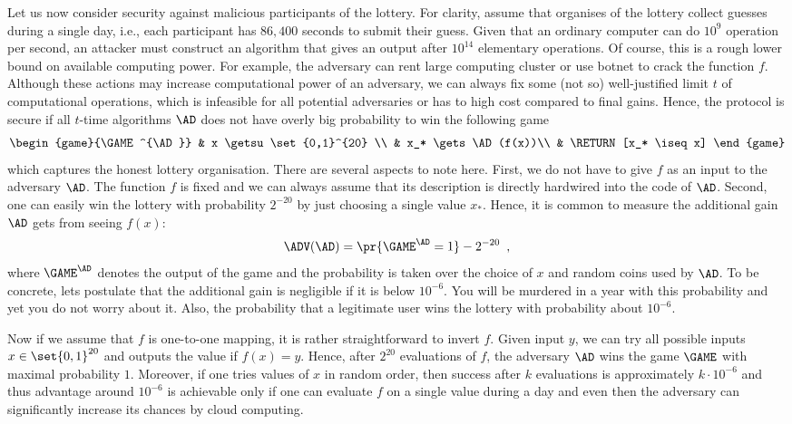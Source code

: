 \documentclass{crypto-exercise}
\begin{document}
\begin{solution}
  Let us now consider security against malicious participants of the
  lottery.  For clarity, assume that organises of the lottery collect
  guesses during a single day, i.e., each participant has $86,400$
  seconds to submit their guess. Given that an ordinary computer can
  do $10^9$ operation per second, an attacker must construct an
  algorithm that gives an output after $10^{14}$ elementary
  operations. Of course, this is a rough lower bound on available
  computing power. For example, the adversary can rent large computing
  cluster or use botnet to crack the function $f$. Although these
  actions may increase computational power of an adversary, we can
  always fix some (not so) well-justified limit $t$ of computational
  operations, which is infeasible for all potential adversaries or has
  to high cost compared to final gains. Hence, the protocol is secure
  if all $t$-time algorithms $\AD$ does not have overly big
  probability to win the following game
  \begin{align*}
    \begin{game}{\GAME^{\AD}}
      & x \getsu \set{0,1}^{20} \\
      & x_* \gets \AD(f(x))\\
      & \RETURN [x_* \iseq x]
    \end{game}
  \end{align*}
  which captures the honest lottery organisation. There are several
  aspects to note here. First, we do not have to give $f$ as an input
  to the adversary $\AD$. The function $f$ is fixed and we can always
  assume that its description is directly hardwired into the code of
  $\AD$. Second, one can easily win the lottery with probability
  $2^{-20}$ by just choosing a single value $x_*$. Hence, it is common
  to measure the additional gain $\AD$ gets from seeing $f(x)$:
  \begin{align*}
    \ADV(\AD)=\pr{\GAME^\AD=1}-2^{-20}\enspace,
  \end{align*}
  where $\GAME^\AD$ denotes the output of the game and the probability
  is taken over the choice of $x$ and random coins used by $\AD$. To
  be concrete, lets postulate that the additional gain is negligible
  if it is below $10^{-6}$. You will be murdered in a year with this
  probability and yet you do not worry about it. Also, the probability
  that a legitimate user wins the lottery with probability about
  $10^{-6}$. 

  Now if we assume that $f$ is one-to-one mapping, it is rather
  straightforward to invert $f$.  Given input $y$, we can try all
  possible inputs $x\in\set{0,1}^{20}$ and outputs the value if
  $f(x)=y$. Hence, after $2^{20}$ evaluations of $f$, the adversary
  $\AD$ wins the game $\GAME$ with maximal probability $1$. Moreover,
  if one tries values of $x$ in random order, then success after $k$
  evaluations is approximately $k\cdot 10^{-6}$ and thus advantage
  around $10^{-6}$ is achievable only if one can evaluate $f$ on a
  single value during a day and even then the adversary can
  significantly increase its chances by cloud computing. 
\end{solution}
\end{document}
